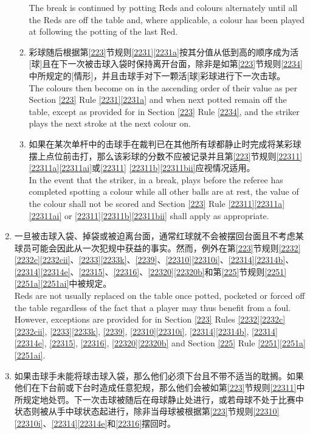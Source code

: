 \begin{enumerate}[label=(\alph*)]
\begin{enumerate}[label=(\roman*)]
        The break is continued by potting Reds and colours alternately until all the Reds are off the table and, where applicable, a colour has been played at following the potting of the last Red.
        \item \label{2233hiii}彩球随后根据第\ref{223}节规则\ref{2231}\ref{2231a}按其分值从低到高的顺序成为活[球]且在下一次被击球入袋时保持离开台面，除非是如第\ref{223}节规则\ref{2234}中所规定的[情形]，并且击球手对下一颗活[球]彩球进行下一次击球。\\
        The colours then become on in the ascending order of their value as per Section \ref{223} Rule \ref{2231}\ref{2231a} and when next potted remain off the table, except as provided for in Section \ref{223} Rule \ref{2234}, and the striker plays the next stroke at the next colour on.
        \item 如果在某次单杆中的击球手在裁判已在其他所有球都静止时完成将某彩球摆上点位前击打，那么该彩球的分数不应被记录并且第\ref{223}节规则\ref{22311}\ref{22311a}\ref{22311ai}或\ref{22311} \ref{22311b}\ref{22311bii}应视情况适用。\\
        In the event that the striker, in a break, plays before the referee has completed spotting a colour while all other balls are at rest, the value of the colour shall not be scored and Section \ref{223} Rule \ref{22311}\ref{22311a} \ref{22311ai} or \ref{22311}\ref{22311b}\ref{22311bii} shall apply as appropriate.
    \end{enumerate}
    \item 一旦被击球入袋、掉袋或被迫离台面，通常红球就不会被摆回台面且不考虑某球员可能会因此从一次犯规中获益的事实。然而，例外在第\ref{223}节规则\ref{2232}\ref{2232c}\ref{2232cii}、\ref{2233}\ref{2233k}、\ref{2239}、\ref{22310}\ref{22310i}、\ref{22314}\ref{22314b}、\ref{22314}\ref{22314e}、\ref{22315}、\ref{22316}、\ref{22320}\ref{22320b}和第\ref{225}节规则\ref{2251}\ref{2251a}\ref{2251ai}中被规定。\\
    Reds are not usually replaced on the table once potted, pocketed or forced off the table regardless of the fact that a player may thus benefit from a foul. However, exceptions are provided for in Section \ref{223} Rules \ref{2232}\ref{2232c}\ref{2232cii}, \ref{2233}\ref{2233k}, \ref{2239}, \ref{22310}\ref{22310i}, \ref{22314}\ref{22314b}, \ref{22314}\ref{22314e}, \ref{22315}, \ref{22316}, \ref{22320}\ref{22320b} and Section \ref{225} Rule \ref{2251}\ref{2251a}\ref{2251ai}.
    \item 如果击球手未能将球击球入袋，那么他们必须下台且不带不适当的耽搁。如果他们在下台前或下台时造成任意犯规，那么他们会被如第\ref{223}节规则\ref{22311}中所规定地处罚。下一次击球被随后在母球静止处进行，或若母球不处于比赛中状态则被从手中球状态起进行，除非当母球被根据第\ref{223}节规则\ref{22310}\ref{22310i}、\ref{22314}\ref{22314e}和\ref{22316}摆回时。\\

\end{enumerate}
